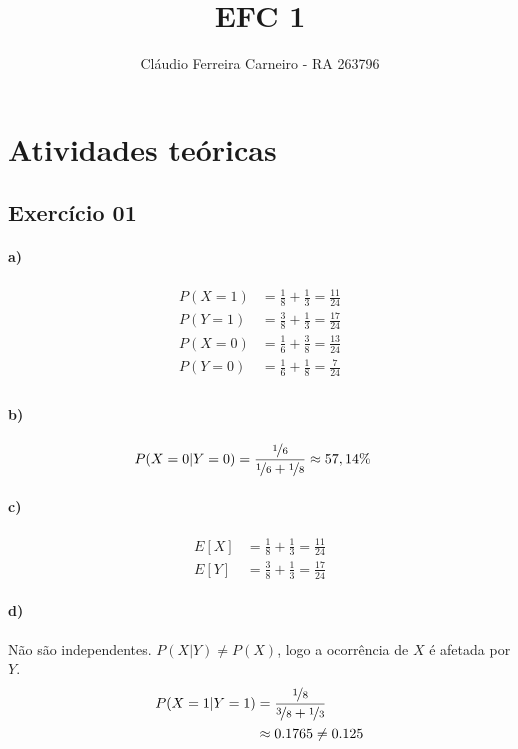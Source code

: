 \documentclass{article}
\author{Cláudio Ferreira Carneiro - RA 263796}
\title{EFC 1}
\begin{document}
    \maketitle
    \newpage
    \section[]{Atividades teóricas}
    \subsection*{Exercício 01}
    \paragraph{a)}
    \begin{align*}
        P(X=1)&=\frac{1}{8} + \frac{1}{3} =\frac{11}{24}\\
        P(Y=1)&=\frac{3}{8} + \frac{1}{3} =\frac{17}{24}\\
        P(X=0)&=\frac{1}{6} + \frac{3}{8} =\frac{13}{24}\\
        P(Y=0)&=\frac{1}{6} + \frac{1}{8} =\frac{7}{24}\\
    \end{align*}
    \paragraph{b)}
    \begin{align*}
        P(X=0|Y=0)&=\frac{\nicefrac{1}{6}}{\nicefrac{1}{6} + \nicefrac{1}{8}} \approx57,14\%
    \end{align*}
    \paragraph{c)}
    \begin{align*}
        E[X] &= \frac{1}{8} + \frac{1}{3} = \frac{11}{24}\\
        E[Y] &= \frac{3}{8} + \frac{1}{3} = \frac{17}{24}
    \end{align*}
    \paragraph{d)}
    Não são independentes. $P(X|Y)\neq P(X)$, logo a ocorrência de $X$ é afetada por $Y$.
    \begin{align*}
        P(X=1|Y=1)&=\frac{\nicefrac{1}{8}}{\nicefrac{3}{8}+\nicefrac{1}{3}}\\
        &\approx 0.1765 \neq 0.125\\
    \end{align*}
\end{document}
